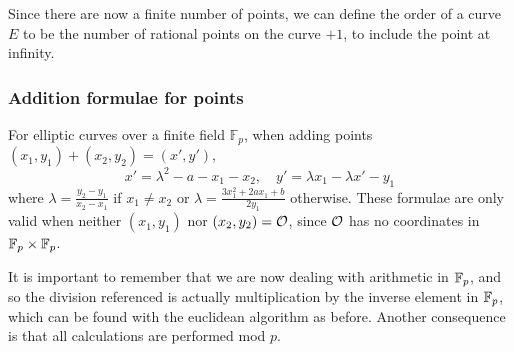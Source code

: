 Since there are now a finite number of points, we can define the order of a curve $E$ to be the number of rational points on the curve $+1$, to include the point at infinity.
\subsubsection{Addition formulae for points}
For elliptic curves over a finite field $\mathbb{F}_p$, when adding points $(x_1,y_1) + (x_2,y_2) = (x',y')$,
$$x'=\lambda^2 - a - x_1 - x_2,\quad y' = \lambda x_1 -\lambda x' - y_1 $$
where $\lambda = \frac{y_2-y_1}{x_2-x_1}$ if $x_1\neq x_2$ or $\lambda=\frac{3x_1^2 + 2ax_1 + b}{2y_1}$ otherwise.
These formulae are only valid when neither $(x_1,y_1)$ nor $(x_2,y_2) = \mathcal{O}$, since $\mathcal{O}$ has no coordinates in $\mathbb{F}_{p} \times \mathbb{F}_{p}$.

It is important to remember that we are now dealing with arithmetic in $\mathbb{F}_{p}$, and so the division referenced is actually multiplication by the inverse element in $\mathbb{F}_{p}$, which can be found with the euclidean algorithm as before.
Another consequence is that all calculations are performed mod $p$.
